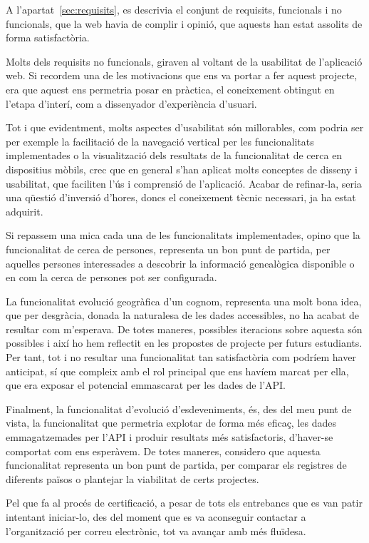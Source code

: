     A l'apartat~\ref{sec:requisits}, es descrivia el conjunt de requisits, funcionals i no funcionals, que la web havia de complir i opinió, que aquests han estat assolits de forma satisfactòria.

    Molts dels requisits no funcionals, giraven al voltant de la usabilitat de l'aplicació web. Si recordem una de les motivacions que ens va portar a fer aquest projecte, era que aquest ens permetria posar en pràctica, el coneixement obtingut en l'etapa d'interí, com a dissenyador d'experiència d'usuari.

    Tot i que evidentment, molts aspectes d'usabilitat són millorables, com podria ser per exemple la facilitació de la navegació vertical per les funcionalitats implementades o la visualització dels resultats de la funcionalitat de cerca en dispositius mòbils, crec que en general s'han aplicat molts conceptes de disseny i usabilitat, que faciliten l'ús i comprensió de l'aplicació. Acabar de refinar-la, seria una qüestió d'inversió d'hores, doncs el coneixement tècnic necessari, ja ha estat adquirit.

    Si repassem una mica cada una de les funcionalitats implementades, opino que la funcionalitat de cerca de persones, representa un bon punt de partida, per aquelles persones interessades a descobrir la informació genealògica disponible o en com la cerca de persones pot ser configurada.

    La funcionalitat evolució geogràfica d'un cognom, representa una molt bona idea, que per desgràcia, donada la naturalesa de les dades accessibles, no ha acabat de resultar com m'esperava. De totes maneres, possibles iteracions sobre aquesta són possibles i així ho hem reflectit en les propostes de projecte per futurs estudiants. Per tant, tot i no resultar una funcionalitat tan satisfactòria com podríem haver anticipat, sí que compleix amb el rol principal que ens havíem marcat per ella, que era exposar el potencial emmascarat per les dades de l'API.

    Finalment, la funcionalitat d'evolució d'esdeveniments, és, des del meu punt de vista, la funcionalitat que permetria explotar de forma més eficaç, les dades emmagatzemades per l'API i produir resultats més satisfactoris, d'haver-se comportat com ens esperàvem. De totes maneres, considero que aquesta funcionalitat representa un bon punt de partida, per comparar els registres de diferents països o plantejar la viabilitat de certs projectes.

    Pel que fa al procés de certificació, a pesar de tots els entrebancs que es van patir intentant iniciar-lo, des del moment que es va aconseguir contactar a l'organització per correu electrònic, tot va avançar amb més fluïdesa.

